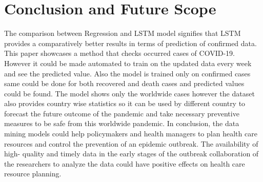 \section{Conclusion and Future Scope}

The comparison between Regression and LSTM model signifies that LSTM provides a
comparatively better results in terms of prediction of confirmed data. This paper showcases a method that checks occurred cases of
COVID-19. However it could be made automated to train on the updated data
every week and see the predicted value. Also the model is trained only on confirmed cases
same could be done for both recovered and death cases and predicted values could be found.
The model shows only the worldwide cases however the dataset also provides country wise
statistics so it can be used by different country to forecast the future outcome of the
pandemic and take necessary preventive measures to be safe from this worldwide
pandemic.  In conclusion,
the data mining models could help policymakers and health managers to plan health care
resources and control the prevention of an epidemic outbreak. The availability of high-
quality and timely data in the early stages of the outbreak collaboration of
the researchers to analyze the data could have positive effects on health care
resource planning.

